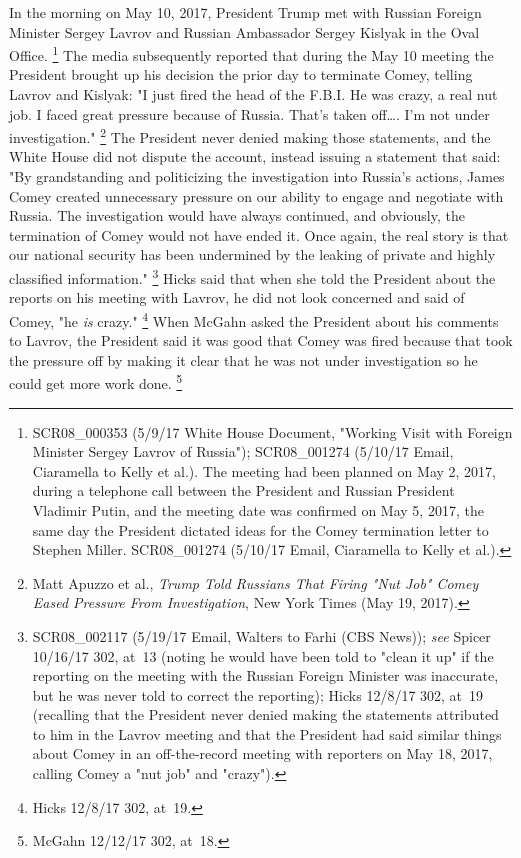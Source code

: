 {In the morning on May 10, 2017, President Trump met with Russian Foreign Minister Sergey Lavrov and Russian Ambassador Sergey Kislyak in the Oval Office.%
\footnote{SCR08\_000353 (5/9/17 White House Document, "Working Visit with Foreign Minister Sergey Lavrov of Russia");
SCR08\_001274 (5/10/17 Email, Ciaramella to Kelly et al.).
The meeting had been planned on May 2, 2017, during a telephone call between the President and Russian President Vladimir Putin, and the meeting date was confirmed on May 5, 2017, the same day the President dictated ideas for the Comey termination letter to Stephen Miller.
SCR08\_001274 (5/10/17 Email, Ciaramella to Kelly et al.).}
The media subsequently reported that during the May 10 meeting the President brought up his decision the prior day to terminate Comey, telling Lavrov and Kislyak:
"I just fired the head of the F.B.I.
He was crazy, a real nut job.
I faced great pressure because of Russia.
That's taken off\dots.
I'm not under investigation."%
\footnote{Matt Apuzzo et al., \textit{Trump Told Russians That Firing "Nut Job" Comey Eased Pressure From Investigation}, New York Times (May 19, 2017).}
The President never denied making those statements, and the White House did not dispute the account, instead issuing a statement that said:
"By grandstanding and politicizing the investigation into Russia's actions, James Comey created unnecessary pressure on our ability to engage and negotiate with Russia.
The investigation would have always continued, and obviously, the termination of Comey would not have ended it.
Once again, the real story is that our national security has been undermined by the leaking of private and highly classified information."%
\footnote{SCR08\_002117 (5/19/17 Email, Walters to Farhi (CBS News));
\textit{see} Spicer 10/16/17 302, at~13 (noting he would have been told to "clean it up" if the reporting on the meeting with the Russian Foreign Minister was inaccurate, but he was never told to correct the reporting);
Hicks 12/8/17 302, at~19 (recalling that the President never denied making the statements attributed to him in the Lavrov meeting and that the President had said similar things about Comey in an off-the-record meeting with reporters on May 18, 2017, calling Comey a "nut job" and "crazy").}
Hicks said that when she told the President about the reports on his meeting with Lavrov, he did not look concerned and said of Comey, "he \textit{is} crazy."%
\footnote{Hicks 12/8/17 302, at~19.}
When McGahn asked the President about his comments to Lavrov, the President said it was good that Comey was fired because that took the pressure off by making it clear that he was not under investigation so he could get more work done.%
\footnote{McGahn 12/12/17 302, at~18.}

}
